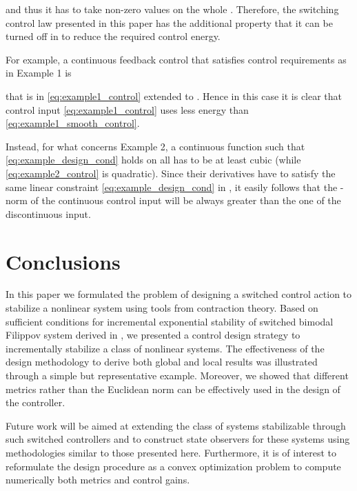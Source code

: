 \documentclass[letterpaper, 10 pt, conference]{ieeeconf}
\begin{document}
and thus it has to take non-zero values on the whole .
Therefore, the switching control law presented in this paper has the additional property that it can be turned off in  to reduce the required control energy.

For example, a continuous feedback control that satisfies control requirements as in Example 1 is

that is  in \eqref{eq:example1_control} extended to . Hence in this case it is clear that control input \eqref{eq:example1_control} uses less energy than \eqref{eq:example1_smooth_control}.

Instead, for what concerns Example 2, a continuous function  such that \eqref{eq:example_design_cond} holds on all  has to be at least cubic (while \eqref{eq:example2_control} is quadratic). Since their derivatives have to satisfy the same linear constraint \eqref{eq:example_design_cond} in , it easily follows that the -norm of the continuous control input will be always greater than the one of the discontinuous input. 





\section{Conclusions}
\label{sec:conclusions}

In this paper we formulated the problem of designing a switched control action to stabilize a nonlinear system using tools from contraction theory. Based on sufficient conditions for incremental exponential stability of switched bimodal Filippov system derived in \cite{fiore2015contraction}, we presented a control design strategy to incrementally stabilize a class of nonlinear systems. The effectiveness of the design methodology to derive both global and local results was illustrated through a simple but representative example. Moreover, we showed that different metrics rather than the Euclidean norm can be effectively used in the design of the controller.

Future work will be aimed at extending the class of systems stabilizable through such switched controllers and to construct state observers for these systems using methodologies similar to those presented here. Furthermore, it is of interest to reformulate the design procedure as a convex optimization problem to compute numerically both metrics and control gains.
\end{document}

